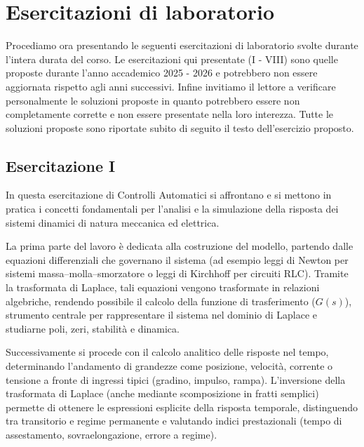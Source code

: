 \documentclass[../main.tex]{subfiles}
\begin{document}
\clearpage
\thispagestyle{empty}
\vspace*{7cm}
\section{Esercitazioni di laboratorio}
\vspace*{1.5cm}

Procediamo ora presentando le seguenti esercitazioni di laboratorio svolte durante l'intera durata del corso. Le esercitazioni qui presentate (I - VIII) sono quelle proposte durante l'anno accademico 2025 - 2026 e potrebbero non essere aggiornata rispetto agli anni successivi. Infine invitiamo il lettore a verificare personalmente le soluzioni proposte in quanto potrebbero essere non completamente corrette e non essere presentate nella loro interezza. Tutte le soluzioni proposte sono riportate subito di seguito il testo dell'esercizio proposto.


\clearpage
\thispagestyle{empty}
\subsection{Esercitazione I}

In questa esercitazione di Controlli Automatici si affrontano e si mettono in pratica i concetti fondamentali per l’analisi e la simulazione della risposta dei sistemi dinamici di natura meccanica ed elettrica.

La prima parte del lavoro è dedicata alla costruzione del modello, partendo dalle equazioni differenziali che governano il sistema (ad esempio leggi di Newton per sistemi massa–molla–smorzatore o leggi di Kirchhoff per circuiti RLC). Tramite la trasformata di Laplace, tali equazioni vengono trasformate in relazioni algebriche, rendendo possibile il calcolo della funzione di trasferimento ($G(s)$), strumento centrale per rappresentare il sistema nel dominio di Laplace e studiarne poli, zeri, stabilità e dinamica.

Successivamente si procede con il calcolo analitico delle risposte nel tempo, determinando l’andamento di grandezze come posizione, velocità, corrente o tensione a fronte di ingressi tipici (gradino, impulso, rampa). L’inversione della trasformata di Laplace (anche mediante scomposizione in fratti semplici) permette di ottenere le espressioni esplicite della risposta temporale, distinguendo tra transitorio e regime permanente e valutando indici prestazionali (tempo di assestamento, sovraelongazione, errore a regime).
\end{document}
